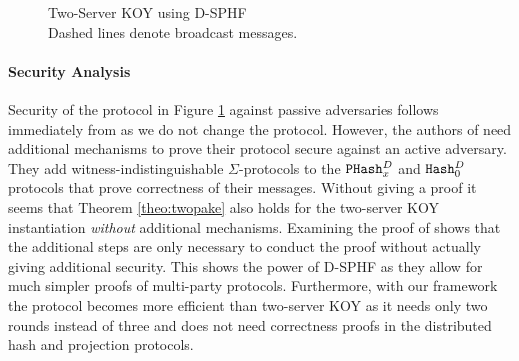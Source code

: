 \begin{figure}[tbhp]
\caption{Two-Server KOY \cite{Katz2012a} using \ac{D-SPHF}
\\{\small Dashed lines denote broadcast messages.}}
\label{fig:twokoy}
\end{figure}

\paragraph{Security Analysis}
Security of the protocol in Figure \ref{fig:twokoy} against passive adversaries follows immediately from \cite[Theorem 1]{Katz2012a} as we do not change the protocol.
However, the authors of \cite{Katz2012a} need additional mechanisms to prove their protocol secure against an active adversary.
They add witness-indistinguishable $\Sigma$-protocols to the $\mathtt{PHash}_x^{D}$ and $\mathtt{Hash}_0^{D}$ protocols that prove correctness of their messages.
Without giving a proof it seems that Theorem \ref{theo:twopake} also holds for the two-server KOY instantiation \emph{without} additional mechanisms.
Examining the proof of \cite[Theorem 2]{Katz2012a} shows that the additional steps are only necessary to conduct the proof without actually giving additional security.
This shows the power of \ac{D-SPHF} as they allow for much simpler proofs of multi-party protocols.
Furthermore, with our framework the protocol becomes more efficient than two-server KOY as it needs only two rounds instead of three and does not need correctness proofs in the distributed hash and projection protocols.
